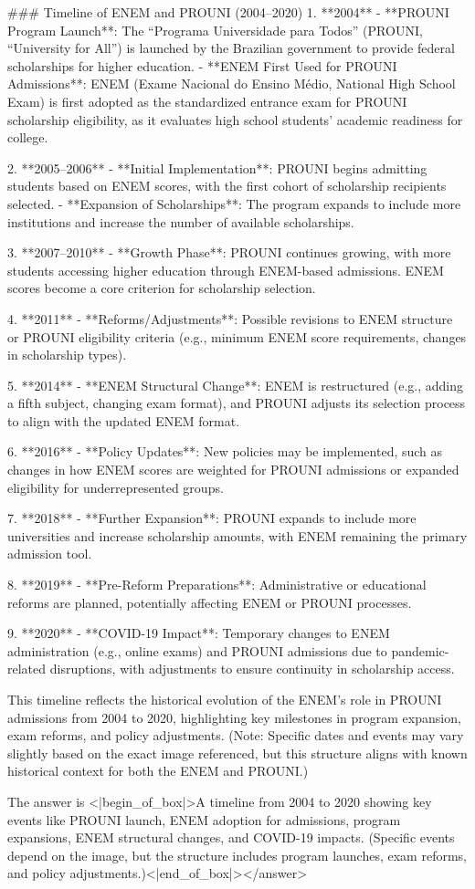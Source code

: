 ### Timeline of ENEM and PROUNI (2004–2020)  
1. **2004**  
   - **PROUNI Program Launch**: The “Programa Universidade para Todos” (PROUNI, “University for All”) is launched by the Brazilian government to provide federal scholarships for higher education.  
   - **ENEM First Used for PROUNI Admissions**: ENEM (Exame Nacional do Ensino Médio, National High School Exam) is first adopted as the standardized entrance exam for PROUNI scholarship eligibility, as it evaluates high school students’ academic readiness for college.  

2. **2005–2006**  
   - **Initial Implementation**: PROUNI begins admitting students based on ENEM scores, with the first cohort of scholarship recipients selected.  
   - **Expansion of Scholarships**: The program expands to include more institutions and increase the number of available scholarships.  

3. **2007–2010**  
   - **Growth Phase**: PROUNI continues growing, with more students accessing higher education through ENEM-based admissions. ENEM scores become a core criterion for scholarship selection.  

4. **2011**  
   - **Reforms/Adjustments**: Possible revisions to ENEM structure or PROUNI eligibility criteria (e.g., minimum ENEM score requirements, changes in scholarship types).  

5. **2014**  
   - **ENEM Structural Change**: ENEM is restructured (e.g., adding a fifth subject, changing exam format), and PROUNI adjusts its selection process to align with the updated ENEM format.  

6. **2016**  
   - **Policy Updates**: New policies may be implemented, such as changes in how ENEM scores are weighted for PROUNI admissions or expanded eligibility for underrepresented groups.  

7. **2018**  
   - **Further Expansion**: PROUNI expands to include more universities and increase scholarship amounts, with ENEM remaining the primary admission tool.  

8. **2019**  
   - **Pre-Reform Preparations**: Administrative or educational reforms are planned, potentially affecting ENEM or PROUNI processes.  

9. **2020**  
   - **COVID-19 Impact**: Temporary changes to ENEM administration (e.g., online exams) and PROUNI admissions due to pandemic-related disruptions, with adjustments to ensure continuity in scholarship access.  


This timeline reflects the historical evolution of the ENEM’s role in PROUNI admissions from 2004 to 2020, highlighting key milestones in program expansion, exam reforms, and policy adjustments. (Note: Specific dates and events may vary slightly based on the exact image referenced, but this structure aligns with known historical context for both the ENEM and PROUNI.)  

The answer is <|begin_of_box|>A timeline from 2004 to 2020 showing key events like PROUNI launch, ENEM adoption for admissions, program expansions, ENEM structural changes, and COVID-19 impacts. (Specific events depend on the image, but the structure includes program launches, exam reforms, and policy adjustments.)<|end_of_box|></answer>